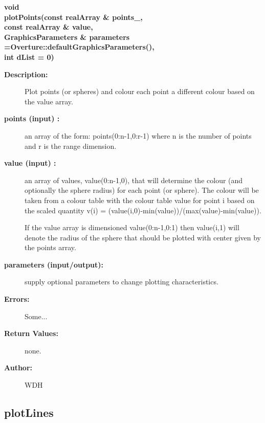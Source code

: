 \begin{flushleft} \textbf{%
void  \\ 
\settowidth{\GLGraphicsInterfaceIncludeArgIndent}{plotPoints(}%
plotPoints(const realArray \& points\_, \\ 
\hspace{\GLGraphicsInterfaceIncludeArgIndent}const realArray \& value,\\ 
GraphicsParameters \& parameters  =Overture::defaultGraphicsParameters(),\\ 
\hspace{\GLGraphicsInterfaceIncludeArgIndent}int dList  = 0)
}\end{flushleft}
\begin{description}
\item[{\bf Description:}] 
   Plot points (or spheres) and colour each point a different colour based on the value array. 
 
\item[{\bf points (input) :}]  an array of the form: points(0:n-1,0:r-1) where n is the number
    of points and r is the range dimension. 
\item[{\bf value (input) :}]  an array of values, value(0:n-1,0), that will determine the colour 
    (and optionally the sphere radius)
    for each point (or sphere). The colour will be taken from a colour table with the colour table
    value for point i based on the scaled quantity v(i) = (value(i,0)-min(value))/(max(value)-min(value)).

    If the value array is dimensioned value(0:n-1,0:1) then value(i,1) will denote the radius of the sphere
    that should be plotted with center given by the points array.
 
\item[{\bf parameters (input/output):}]  supply optional parameters to change
    plotting characteristics.
\item[{\bf Errors:}]   Some...
\item[{\bf Return Values:}]  none.

\item[{\bf Author:}]  WDH
\end{description}
\subsection{plotLines}
 
